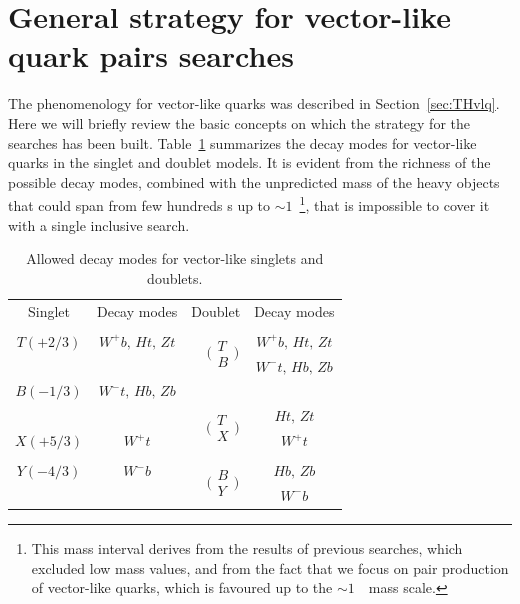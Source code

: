 \section{General strategy for vector-like quark pairs searches}\label{sec:strategy}

The phenomenology for vector-like quarks was described in Section~\ref{sec:THvlq}.
Here we will briefly review the basic concepts on which
the strategy for the searches has been built. Table~\ref{tab:vlqdecays} summarizes the 
decay modes for vector-like quarks in the singlet and doublet models. It is evident
from the richness of the possible decay modes, combined with the unpredicted mass
of the heavy objects that could span from few hundreds \gev s up to  
$\sim 1$~\tev\footnote{This mass interval derives from the results of previous searches,
which excluded low mass values, and from the fact that we focus on pair production of vector-like
quarks, which is favoured up to the $\sim 1$~\tev\ mass scale.}, %
that is impossible to cover it with a single inclusive search.

\begin{table}[htb]\centering
\begin{tabular}{|cc|cc|}\toprule
Singlet & Decay modes & Doublet & Decay modes\\
& & &\\
$T(+2/3)$ & $W^+b,\, Ht,\, Zt$ & \multirow{2}{*}{$\quad\bigg(\begin{array}{c}T \\ B\end{array}\bigg)$} & $W^+b,\, Ht,\, Zt$\\ 
& & & $ W^-t,\, Hb,\, Zb$\\
$B(-1/3)$ & $ W^-t,\, Hb,\, Zb$ & & \\
& & \multirow{2}{*}{$\quad\bigg(\begin{array}{c}T \\ X\end{array}\bigg)$} & $Ht,\, Zt$\\
$X(+5/3)$ & $W^+t$ & & $W^+t$\\
& & &\\
$Y(-4/3)$ & $W^-b$ & \multirow{2}{*}{$\quad\bigg(\begin{array}{c}B \\ Y\end{array}\bigg)$} & $Hb,\, Zb$\\
& & & $W^-b$\\\bottomrule
\end{tabular}
\caption{Allowed decay modes for vector-like singlets and doublets.}\label{tab:vlqdecays}
\end{table}

